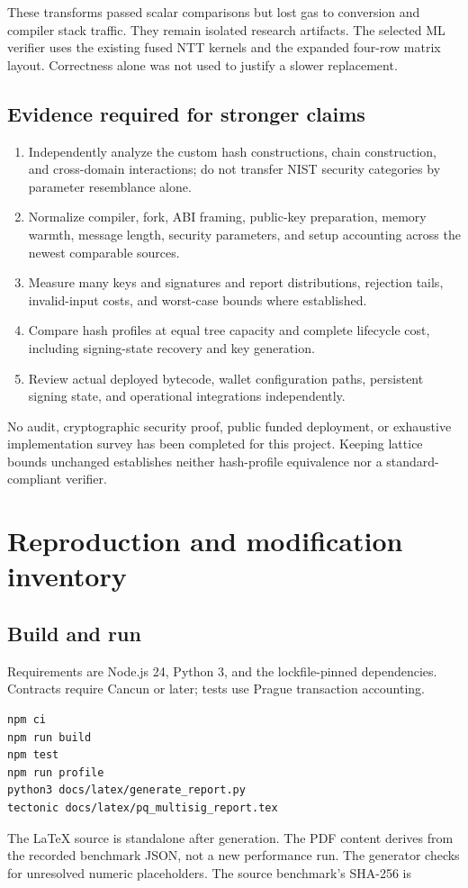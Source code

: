 \documentclass[11pt,a4paper]{article}
\begin{document}
These transforms passed scalar comparisons but lost gas to conversion and
compiler stack traffic. They remain isolated research artifacts. The selected
ML verifier uses the existing fused NTT kernels and the expanded four-row
matrix layout. Correctness alone was not used to justify a slower replacement.

\subsection{Evidence required for stronger claims}
\begin{enumerate}
\item Independently analyze the custom hash constructions, chain construction,
and cross-domain interactions; do not transfer NIST security categories by
parameter resemblance alone.
\item Normalize compiler, fork, ABI framing, public-key preparation, memory
warmth, message length, security parameters, and setup accounting across
the newest comparable sources.
\item Measure many keys and signatures and report distributions, rejection
tails, invalid-input costs, and worst-case bounds where established.
\item Compare hash profiles at equal tree capacity and complete lifecycle
cost, including signing-state recovery and key generation.
\item Review actual deployed bytecode, wallet configuration paths, persistent
signing state, and operational integrations independently.
\end{enumerate}
No audit, cryptographic security proof, public funded deployment, or exhaustive
implementation survey has been completed for this project. Keeping lattice
bounds unchanged establishes neither hash-profile equivalence nor a
standard-compliant verifier.

\newpage
\section{Reproduction and modification inventory}
\subsection{Build and run}
Requirements are Node.js 24, Python 3, and the lockfile-pinned dependencies.
Contracts require Cancun or later; tests use Prague transaction accounting.
\begin{lstlisting}
npm ci
npm run build
npm test
npm run profile
python3 docs/latex/generate_report.py
tectonic docs/latex/pq_multisig_report.tex
\end{lstlisting}
The LaTeX source is standalone after generation. The PDF content derives from
the recorded benchmark JSON, not a new performance run. The generator checks
for unresolved numeric placeholders. The source benchmark's SHA-256 is
\begin{quote}\small{}\end{quote}
\end{document}
